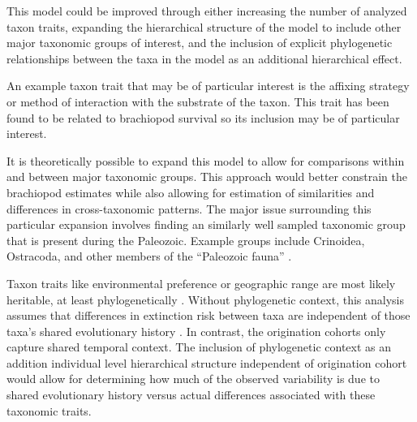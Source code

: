 \documentclass{article}
\begin{document}
This model could be improved through either increasing the number of analyzed taxon traits, expanding the hierarchical structure of the model to include other major taxonomic groups of interest, and the inclusion of explicit phylogenetic relationships between the taxa in the model as an additional hierarchical effect.

An example taxon trait that may be of particular interest is the affixing strategy or method of interaction with the substrate of the taxon. This trait has been found to be related to brachiopod survival \citep{Alexander1977} so its inclusion may be of particular interest.

It is theoretically possible to expand this model to allow for comparisons within and between major taxonomic groups. This approach would better constrain the brachiopod estimates while also allowing for estimation of similarities and differences in cross-taxonomic patterns. The major issue surrounding this particular expansion involves finding an similarly well sampled taxonomic group that is present during the Paleozoic. Example groups include Crinoidea, Ostracoda, and other members of the ``Paleozoic fauna'' \citep{SepkoskiJr.1981a}.

Taxon traits like environmental preference or geographic range \citep{Jablonski1987,Hunt2005b} are most likely heritable, at least phylogenetically \citep{Lynch1991,Housworth2004}. Without phylogenetic context, this analysis assumes that differences in extinction risk between taxa are independent of those taxa's shared evolutionary history \citep{Felsenstein1985b}. In contrast, the origination cohorts only capture shared temporal context. The inclusion of phylogenetic context as an addition individual level hierarchical structure independent of origination cohort would allow for determining how much of the observed variability is due to shared evolutionary history versus actual differences associated with these taxonomic traits. 
\end{document}
